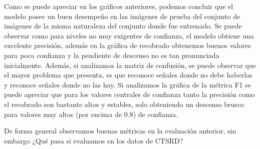 \documentclass{article}
\begin{document}
Como se puede apreciar en los gráficos anteriores, podemos concluir que el modelo posee un buen desempeño en las imágenes de prueba del conjunto de imágenes de la misma naturaleza del conjunto donde fue entrenado. Se puede observar como para niveles no muy exigentes de confianza, el modelo obtiene una excelente precisión, además en la gráfica de recobrado obtenemos buenos valores para poca confianza y la pendiente de descenso no es tan pronunciada inicialmente. Además, si analizamos la matriz de confusión, se puede observar que el mayor problema que presenta, es que reconoce señales donde no debe haberlas y reconoce señales donde no las hay. Si analizamos la gráfica de la métrica F1 se puede apreciar que para los valores centrales de confianza tanto la precisión como el recobrado son bastante altos y estables, solo obteniendo un descenso brusco para valores muy altos (por encima de 0.8) de confianza.

De forma general observamos buenas métricas en la evaluación anterior, sin embargo ¿Qué pasa si evaluamos en los datos de CTSRD?
\end{document}
